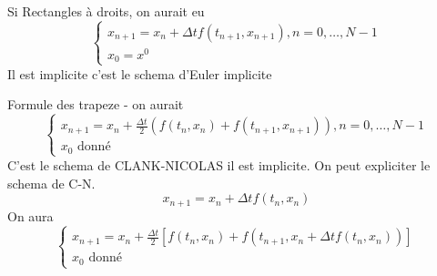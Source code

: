 \begin{remark}
   Si Rectangles à droits, on aurait eu
   \begin{equation}
       \begin{cases}
            x_{n+1} = x_n + \Delta t f(t_{n+1}, x_{n+1}), n = 0, \ldots, N-1\\
            x_0 = x^0
       \end{cases}
   \end{equation}
   Il est implicite c'est le schema d'Euler implicite
\end{remark}
\begin{remark}
   Formule des trapeze - on aurait 
   \begin{equation}
       \begin{cases}
            x_{n+1} = x_n + \frac{\Delta t}{2}(f(t_n, x_n) + f(t_{n+1}, x_{n+1})), n = 0, \ldots, N-1\\
            x_0 \text{ donné}
       \end{cases}
   \end{equation}
    C'est le schema de CLANK-NICOLAS il est implicite. On peut expliciter le schema de C-N.
    \[
    x_{n+1} = x_n + \Delta t f(t_n, x_n)
    \] 
    On aura 
    \begin{equation}
        \begin{cases}
            x_{n+1} = x_n + \frac{\Delta t}{2}\left[ f(t_n, x_n) + f(t_{n+1}, x_n + \Delta t f(t_n, x_n)) \right] \\
            x_0 \text{ donné}
        \end{cases}
    \end{equation}
\end{remark}
